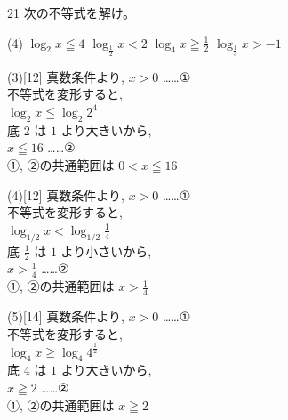 \documentclass[14pt,dvipdfmx]{jsarticle}
\begin{document}
\enlargethispage{6zw}
\begin{practiceprob}{21}
  次の不等式を解け。
  \vspace{-1em}
  \begin{tasks}[label=(\arabic*), label-width=1.4zw, item-indent=1.7zw, after-item-skip=0.02em](4)
    \task[(3)] $\log_{2} x \leqq 4$
    \task[(4)] $\log_{\frac{1}{2}} x < 2$
    \task[(5)] $\log_{4} x \geqq \tfrac{1}{2}$
    \task[(6)] $\log_{\frac{1}{3}} x > -1$
  \end{tasks}
\end{practiceprob}
\vspace{-0.4em}
\begin{minipage}[t]{0.48\textwidth}
\begin{answerbox}{(3)}[12]
  {\footnotesize
  真数条件より, $x>0$ \quad ……①\\
  不等式を変形すると,\\
  $\log_{2} x \leqq \log_{2} 2^{4}$\\
  底 $2$ は $1$ より大きいから,\\
  $x\leqq 16$ \quad ……②\\
  ①, ②の共通範囲は $0<x\leqq 16$}
\end{answerbox}
\end{minipage}\hfill
\begin{minipage}[t]{0.48\textwidth}
\begin{answerbox}{(4)}[12]
  {\footnotesize
  真数条件より, $x>0$ \quad ……①\\
  不等式を変形すると,\\
  $\log_{1/2} x < \log_{1/2}\tfrac{1}{4}$\\
  底 $\frac{1}{2}$ は $1$ より小さいから,\\
  $x>\tfrac{1}{4}$ \quad ……②\\
  ①, ②の共通範囲は $x>\tfrac{1}{4}$}
\end{answerbox}
\end{minipage}
\vspace{0.08em}
\begin{minipage}[t]{0.48\textwidth}
\begin{answerbox}{(5)}[14]
  {\footnotesize
  真数条件より, $x>0$ ……①\\
  不等式を変形すると,\\
  $\log_{4} x \geqq \log_{4} 4^{\frac{1}{2}}$\\
  底 $4$ は $1$ より大きいから,\\
  $x\geqq 2$ ……②\\
  ①, ②の共通範囲は $x\geqq 2$}
\end{answerbox}
\end{minipage}\hfill
\end{document}
